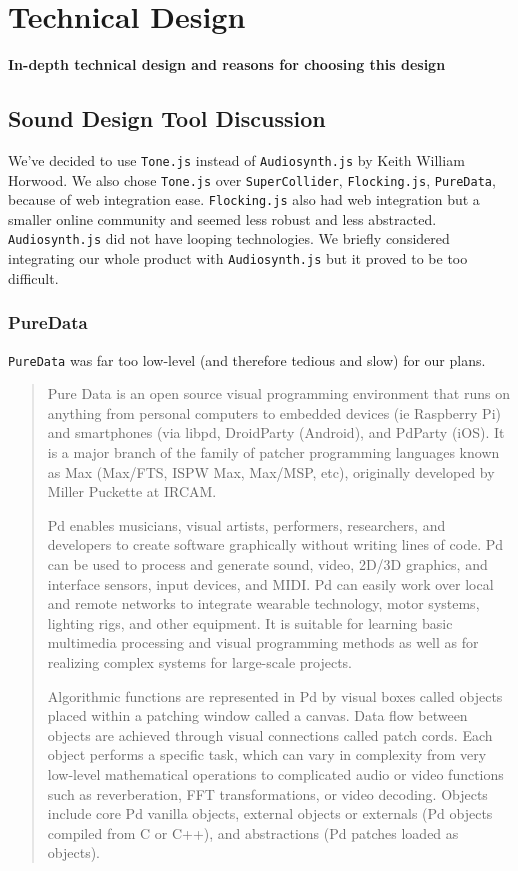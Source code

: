 \documentclass[12pt,a4paper]{article}
\newcommand{\lightcode}[1]{\colorbox{light-gray}{\texttt{#1}}}
\begin{document}
\pagebreak
\section{Technical Design}
\textbf{In-depth technical design and reasons for choosing this design}

\subsection{Sound Design Tool Discussion}
We've decided to use \lightcode{Tone.js} instead of \lightcode{Audiosynth.js} by Keith William Horwood. We also chose \lightcode{Tone.js} over \lightcode{SuperCollider}, \lightcode{Flocking.js}, \lightcode{PureData}, because of web integration ease. \lightcode{Flocking.js} also had web integration but a smaller online community and seemed less robust and less abstracted. \lightcode{Audiosynth.js} did not have looping technologies. We briefly considered integrating our whole product with \lightcode{Audiosynth.js} but it proved to be too difficult.

\subsubsection{PureData}
\lightcode{PureData} was far too low-level (and therefore tedious and slow) for our plans.

\begin{quote}
Pure Data is an open source visual programming environment that runs on anything from personal computers to embedded devices (ie Raspberry Pi) and smartphones (via libpd, DroidParty (Android), and PdParty (iOS). It is a major branch of the family of patcher programming languages known as Max (Max/FTS, ISPW Max, Max/MSP, etc), originally developed by Miller Puckette at IRCAM.

Pd enables musicians, visual artists, performers, researchers, and developers to create software graphically without writing lines of code. Pd can be used to process and generate sound, video, 2D/3D graphics, and interface sensors, input devices, and MIDI. Pd can easily work over local and remote networks to integrate wearable technology, motor systems, lighting rigs, and other equipment. It is suitable for learning basic multimedia processing and visual programming methods as well as for realizing complex systems for large-scale projects.

Algorithmic functions are represented in Pd by visual boxes called objects placed within a patching window called a canvas. Data flow between objects are achieved through visual connections called patch cords. Each object performs a specific task, which can vary in complexity from very low-level mathematical operations to complicated audio or video functions such as reverberation, FFT transformations, or video decoding. Objects include core Pd vanilla objects, external objects or externals (Pd objects compiled from C or C++), and abstractions (Pd patches loaded as objects). \cite{puredata}
\end{quote}
\end{document}
